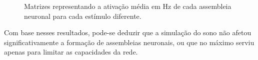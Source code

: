 \begin{figure}[!ht]
\caption{Matrizes representando a ativação média em Hz de cada assembleia neuronal para cada estímulo diferente.}
\end{figure}

Com base nesses resultados, pode-se deduzir que a simulação do sono não afetou significativamente a formação de assembleias
neuronais, ou que no máximo serviu apenas para limitar as capacidades da rede.

